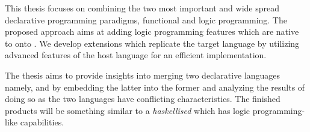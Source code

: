 

\begin{unbcabstract}

This thesis focuses on combining the two most important and wide spread declarative programming paradigms, 
functional and logic programming. The proposed approach 
aims at adding logic programming features which are native to  onto . We
develop extensions which replicate the target language by utilizing advanced features of the host language
for an efficient implementation.      

The thesis aims to provide insights into merging two declarative languages namely,  and
 by embedding the latter into the former and analyzing the results of doing so as the two languages have
conflicting characteristics.
The finished products will be something similar to a \textit{haskellised}  which has logic programming-like capabilities.

\end{unbcabstract}

